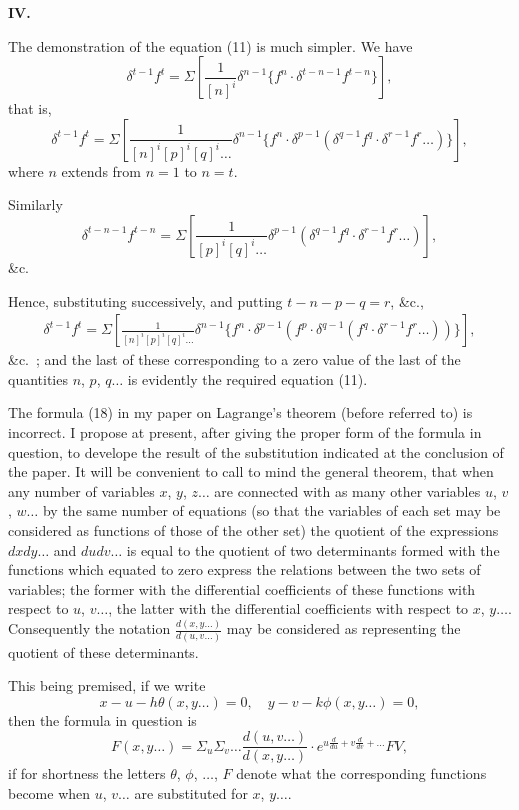 \documentclass[11pt,a4paper]{book}
\begin{document}
\bigskip
\noindent\textbf{IV.}

The demonstration of the equation (11) is much simpler. We have
\[ \delta^{t-1} f^t = \Sigma \left[ \frac{1}{[n]^i} \delta^{n-1} \{ f^n \cdot \delta^{t-n-1} f^{t-n} \} \right], \]
that is,
\[ \delta^{t-1} f^t = \Sigma \left[ \frac{1}{[n]^i [p]^i [q]^i \ldots} \delta^{n-1} \{ f^n \cdot \delta^{p-1} (\delta^{q-1} f^q \cdot \delta^{r-1} f^r \ldots) \} \right], \]
where $n$ extends from $n=1$ to $n=t$.

Similarly
\[ \delta^{t-n-1} f^{t-n} = \Sigma \left[ \frac{1}{[p]^i [q]^i \ldots} \delta^{p-1} (\delta^{q-1} f^q \cdot \delta^{r-1} f^r \ldots) \right], \]
\&c.

Hence, substituting successively, and putting $t - n - p - q = r$, \&c.,
\begin{multline*}
\delta^{t-1} f^t = \Sigma \left[ \frac{1}{[n]^i [p]^i [q]^i \ldots} \delta^{n-1} \{ f^n \cdot \delta^{p-1} (f^p \cdot \delta^{q-1} (f^q \cdot \delta^{r-1} f^r \ldots)) \} \right],
\end{multline*}
\&c.\ ;
and the last of these corresponding to a zero value of the last of the quantities $n$, $p$, $q \ldots$ is evidently the required equation (11).

The formula (18) in my paper on Lagrange's theorem (before referred to) is incorrect. I propose at present, after giving the proper form of the formula in question, to develope the result of the substitution indicated at the conclusion of the paper. It will be convenient to call to mind the general theorem, that when any number of variables $x$, $y$, $z \ldots$ are connected with as many other variables $u$, $v$, $w \ldots$ by the same number of equations (so that the variables of each set may be considered as functions of those of the other set) the quotient of the expressions $dxdy\ldots$ and $dudv\ldots$ is equal to the quotient of two determinants formed with the functions which equated to zero express the relations between the two sets of variables; the former with the differential coefficients of these functions with respect to $u$, $v \ldots$, the latter with the differential coefficients with respect to $x$, $y \ldots$. Consequently the notation $\frac{d(x,y\ldots)}{d(u,v\ldots)}$ may be considered as representing the quotient of these determinants.

This being premised, if we write
\[ x - u - h\theta(x,y\ldots) = 0, \quad y - v - k\phi(x,y\ldots) = 0, \]
then the formula in question is
\[ F(x,y\ldots) = \Sigma_u \Sigma_v \ldots \frac{d(u,v\ldots)}{d(x,y\ldots)} \cdot e^{u\frac{d}{du} + v\frac{d}{dv} + \ldots} FV, \]
if for shortness the letters $\theta$, $\phi$, $\ldots$, $F$ denote what the corresponding functions become when $u$, $v \ldots$ are substituted for $x$, $y \ldots$.
\end{document}
